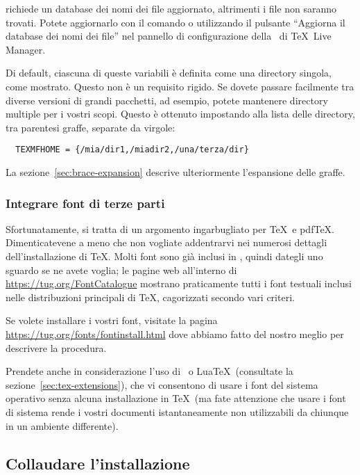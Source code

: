 \documentclass{article}
\begin{document}
 richiede un database dei nomi dei file aggiornato,
altrimenti i file non saranno trovati. Potete aggiornarlo con il comando
 o utilizzando il pulsante ``Aggiorna il database dei
nomi dei file'' nel pannello di configurazione della \GUI\ di \TeX\ Live
Manager.

Di default, ciascuna di queste variabili è definita come una directory
singola, come mostrato. Questo non è un requisito rigido. Se dovete passare
facilmente tra diverse versioni di grandi pacchetti, ad esempio, potete
mantenere directory multiple per i vostri scopi. Questo è ottenuto
impostando  alla lista delle directory, tra parentesi
graffe, separate da virgole:

\begin{verbatim}
  TEXMFHOME = {/mia/dir1,/miadir2,/una/terza/dir}
\end{verbatim}

La sezione~\ref{sec:brace-expansion} descrive ulteriormente l'espansione
delle graffe.


\subsubsection{Integrare font di terze parti}

Sfortunatamente, si tratta di un argomento ingarbugliato per \TeX\ e pdf\TeX.
Dimenticatevene a meno che non vogliate addentrarvi nei numerosi dettagli
dell'installazione di \TeX{}. Molti font sono già inclusi in \TL, quindi
dategli uno sguardo se ne avete voglia; le pagine web all'interno di
\url{https://tug.org/FontCatalogue} mostrano praticamente tutti i font testuali
inclusi nelle distribuzioni principali di \TeX, cagorizzati secondo vari
criteri.

Se volete installare i vostri font, visitate la pagina
\url{https://tug.org/fonts/fontinstall.html} dove abbiamo fatto del nostro
meglio per descrivere la procedura.

Prendete anche in considerazione l'uso di \XeTeX\ o Lua\TeX\ (consultate
la sezione~\ref{sec:tex-extensions}), che vi consentono di usare i font
del sistema operativo senza alcuna installazione in \TeX\ (ma fate attenzione
che usare i font di sistema rende i vostri documenti istantaneamente non
utilizzabili da chiunque in un ambiente differente).

\subsection{Collaudare l'installazione}
\label{sec:test-install}
\end{document}
